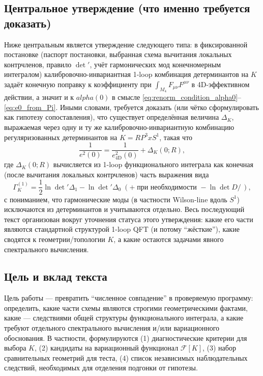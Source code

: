 \documentclass[12pt]{article}
\def\mathbb#1{#1}%
\def\alpha{alpha}%
\def\times{x}%
\begin{document}
\subsection{Центральное утверждение (что именно требуется доказать)}
Ниже центральным является утверждение следующего типа: в фиксированной постановке (паспорт постановки, выбранная схема вычитания локальных контрчленов, правило $\det'$, учёт гармонических мод конечномерным интегралом) калибровочно-инвариантная 1-loop комбинация детерминантов на $K$ задаёт конечную поправку к коэффициенту при $\int_{M_4}F_{\mu\nu}F^{\mu\nu}$ в 4D-эффективном действии, а значит и к $\alpha(0)$ в смысле \eqref{eq:renorm_condition_alpha0}--\eqref{eq:e0_from_Pi}.
Иными словами, требуется доказать (или чётко сформулировать как гипотезу сопоставления), что существует определённая величина $\Delta_K$, выражаемая через одну и ту же калибровочно-инвариантную комбинацию регуляризованных детерминантов на $K=\mathbb{RP}^3\times S^1$, такая что
\begin{equation}
  \frac{1}{e^2(0)}
  =
  \frac{1}{e^2_{\mathrm{4D}}(0)}
  +
  \Delta_K(0;R),
\end{equation}
где $\Delta_K(0;R)$ вычисляется из 1-loop функционального интеграла как конечная (после вычитания локальных контрчленов) часть выражения вида
\begin{equation}
  \Gamma^{(1)}_K
  =
  \frac12\ln\det'\Delta_1
  -\ln\det'\Delta_0
  \;(+\;\text{при необходимости }-\ln\det D\!\!\!\!/\,),
\end{equation}
с пониманием, что гармонические моды (в частности Wilson-line вдоль $S^1$) исключаются из детерминантов и учитываются отдельно.
Весь последующий текст организован вокруг уточнения статуса этого утверждения: какие его части являются стандартной структурой 1-loop QFT (и потому ``жёсткие''), какие сводятся к геометрии/топологии $K$, а какие остаются задачами явного спектрального вычисления.

\subsection{Цель и вклад текста}
Цель работы --- превратить ``численное совпадение'' в проверяемую программу: определить, какие части схемы являются строгими геометрическими фактами, какие --- следствиями общей структуры функционального интеграла, а какие требуют отдельного спектрального вычисления и/или вариационного обоснования.
В частности, формулируются (1) диагностические критерии для выбора $K$, (2) кандидаты на вариационный функционал $\mathcal{F}[K]$, (3) набор сравнительных геометрий для теста, (4) список независимых наблюдательных следствий, необходимых для отделения подгонки от гипотезы.
\end{document}
